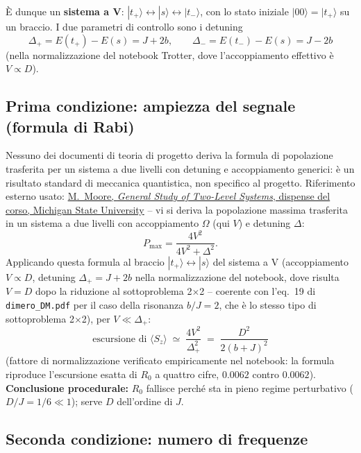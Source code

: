 \documentclass[11pt,a4paper]{article}
\begin{document}
\`E dunque un \textbf{sistema a V}: $|t_+\rangle\leftrightarrow|s\rangle\leftrightarrow|t_-\rangle$,
con lo stato iniziale $|00\rangle=|t_+\rangle$ su un braccio. I due parametri
di controllo sono i detuning
$$\Delta_+=E(t_+)-E(s)=J+2b, \qquad \Delta_-=E(t_-)-E(s)=J-2b$$
(nella normalizzazione del notebook Trotter, dove l'accoppiamento
effettivo è $V\propto D$).

\subsection{Prima condizione: ampiezza del segnale (formula di Rabi)}

Nessuno dei documenti di teoria di progetto deriva la formula di
popolazione trasferita per un sistema a due livelli con detuning e
accoppiamento generici: è un risultato standard di meccanica quantistica,
non specifico al progetto. Riferimento esterno usato:
\href{https://web.pa.msu.edu/people/mmoore/Lect7_RabiModel.pdf}{M.\ Moore,
\emph{General Study of Two-Level Systems}, dispense del corso, Michigan
State University} -- vi si deriva la popolazione massima trasferita in un
sistema a due livelli con accoppiamento $\Omega$ (qui $V$) e detuning
$\Delta$:
$$P_{\max} = \frac{4V^2}{4V^2+\Delta^2}.$$
Applicando questa formula al braccio $|t_+\rangle\leftrightarrow|s\rangle$
del sistema a V (accoppiamento $V\propto D$, detuning $\Delta_+=J+2b$ nella
normalizzazione del notebook, dove risulta $V=D$ dopo la riduzione al
sottoproblema 2$\times$2 -- coerente con l'eq.~19 di
\texttt{dimero\_DM.pdf} per il caso della risonanza $b/J=2$, che è lo stesso
tipo di sottoproblema 2$\times$2), per $V\ll\Delta_+$:
$$\text{escursione di }\langle S_z\rangle \;\simeq\; \frac{4V^2}{\Delta_+^2} \;=\; \frac{D^2}{2(b+J)^2}$$
(fattore di normalizzazione verificato empiricamente nel notebook: la
formula riproduce l'escursione esatta di $R_0$ a quattro cifre, $0.0062$
contro $0.0062$). \textbf{Conclusione procedurale:} $R_0$ fallisce perché sta
in pieno regime perturbativo ($D/J=1/6\ll1$); serve $D$ dell'ordine di $J$.

\subsection{Seconda condizione: numero di frequenze}
\end{document}
